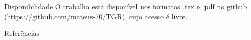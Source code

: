 \documentclass[xcolor=dvipsnames]{beamer}
\begin{document}
\begin{frame}{Disponibilidade}
    O trabalho está disponível nos formatos .tex e .pdf no github (\url{https://github.com/mateus-70/TGR}), cujo acesso é livre.
\end{frame}

\begin{frame}[allowframebreaks]{Referências}
    \nocite{*}
    \printbibliography[block=none, heading=none]
\end{frame}
\end{document}
